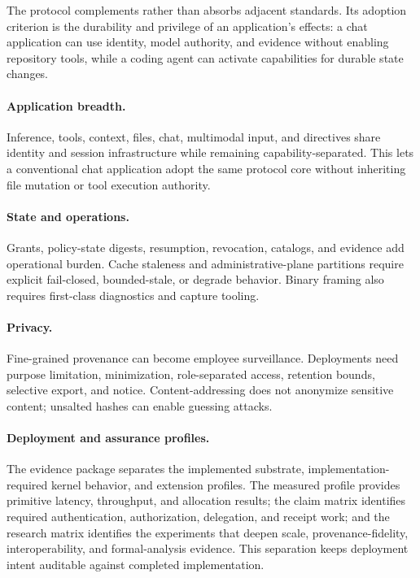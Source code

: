 \documentclass[10pt]{article}
\begin{document}
The protocol complements rather than absorbs adjacent standards. Its adoption criterion is the durability and privilege of an application's effects: a chat application can use identity, model authority, and evidence without enabling repository tools, while a coding agent can activate capabilities for durable state changes.

\paragraph{Application breadth.}
Inference, tools, context, files, chat, multimodal input, and directives share identity and session infrastructure while remaining capability-separated. This lets a conventional chat application adopt the same protocol core without inheriting file mutation or tool execution authority.

\paragraph{State and operations.}
Grants, policy-state digests, resumption, revocation, catalogs, and evidence add operational burden. Cache staleness and administrative-plane partitions require explicit fail-closed, bounded-stale, or degrade behavior. Binary framing also requires first-class diagnostics and capture tooling.

\paragraph{Privacy.}
Fine-grained provenance can become employee surveillance. Deployments need purpose limitation, minimization, role-separated access, retention bounds, selective export, and notice. Content-addressing does not anonymize sensitive content; unsalted hashes can enable guessing attacks.

\paragraph{Deployment and assurance profiles.}
The evidence package separates the implemented substrate, implementation-required kernel behavior, and extension profiles. The measured profile provides primitive latency, throughput, and allocation results; the claim matrix identifies required authentication, authorization, delegation, and receipt work; and the research matrix identifies the experiments that deepen scale, provenance-fidelity, interoperability, and formal-analysis evidence. This separation keeps deployment intent auditable against completed implementation.
\end{document}
